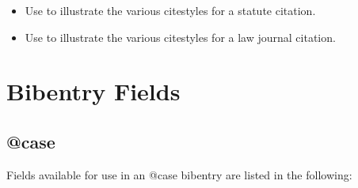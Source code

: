 

\begin{itemize}
\item Use  to illustrate the various citestyles for a statute citation.
\end{itemize}




\begin{itemize}
\item Use  to illustrate the various citestyles for a law journal citation.
\end{itemize}


\lcsetstylemcgill%


\section{Bibentry Fields}
\subsection{@case}
\p Fields available for use in an @case bibentry are listed in the following:

